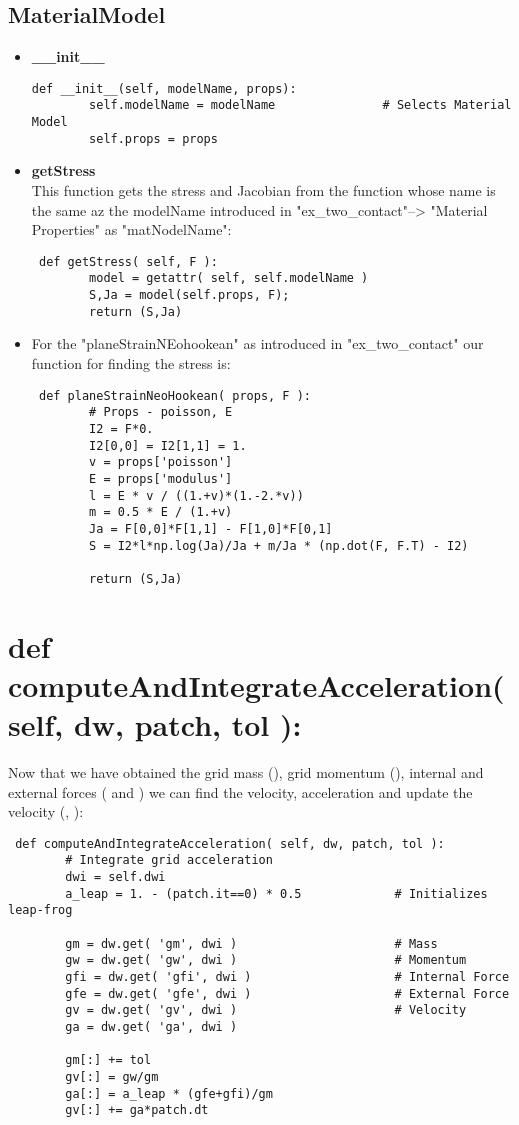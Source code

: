 \documentclass[11pt,fleqn]{book} %
\begin{document}
\subsection{MaterialModel}
\begin{itemize}
\item \textbf{\_\_init\_\_}\\
\begin{lstlisting}
def __init__(self, modelName, props):
        self.modelName = modelName               # Selects Material Model
        self.props = props        
\end{lstlisting}
\item \textbf{getStress}\\
This function gets the stress and Jacobian from the function whose name is the same az the modelName introduced in "ex\_two\_contact"--> "Material Properties" as "matNodelName":
\begin{lstlisting}
 def getStress( self, F ):
        model = getattr( self, self.modelName )
        S,Ja = model(self.props, F);    
        return (S,Ja)     
\end{lstlisting}
\item For the  "planeStrainNEohookean" as introduced in "ex\_two\_contact" our function for finding the stress is:
\begin{lstlisting}
 def planeStrainNeoHookean( props, F ):
        # Props - poisson, E
        I2 = F*0.
        I2[0,0] = I2[1,1] = 1.
        v = props['poisson']
        E = props['modulus']
        l = E * v / ((1.+v)*(1.-2.*v))
        m = 0.5 * E / (1.+v)
        Ja = F[0,0]*F[1,1] - F[1,0]*F[0,1]
        S = I2*l*np.log(Ja)/Ja + m/Ja * (np.dot(F, F.T) - I2)
        
        return (S,Ja)    
\end{lstlisting}
\end{itemize}


\section{ def computeAndIntegrateAcceleration( self, dw, patch, tol ):}
Now that we have obtained the grid mass (), grid momentum (), internal and external forces ( and ) we can find the velocity, acceleration and update the velocity (, ):

\begin{lstlisting}
 def computeAndIntegrateAcceleration( self, dw, patch, tol ):
        # Integrate grid acceleration
        dwi = self.dwi
        a_leap = 1. - (patch.it==0) * 0.5             # Initializes leap-frog
        
        gm = dw.get( 'gm', dwi )                      # Mass
        gw = dw.get( 'gw', dwi )                      # Momentum
        gfi = dw.get( 'gfi', dwi )                    # Internal Force
        gfe = dw.get( 'gfe', dwi )                    # External Force
        gv = dw.get( 'gv', dwi )                      # Velocity
        ga = dw.get( 'ga', dwi )
        
        gm[:] += tol
        gv[:] = gw/gm
        ga[:] = a_leap * (gfe+gfi)/gm
        gv[:] += ga*patch.dt
\end{lstlisting}
\end{document}
